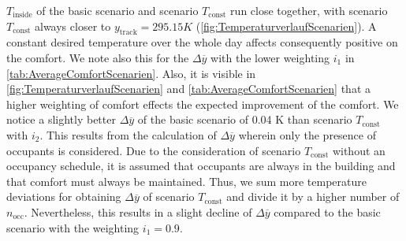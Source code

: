 $T_\text{inside}$ of the basic scenario and scenario $T_\text{const}$ run close together, with scenario $T_\text{const}$ always closer to $y_\text{track} = 295.15 K$ (\autoref{fig:TemperaturverlaufScenarien}). A constant desired temperature over the whole day affects consequently positive on the comfort. We note also this for the $\Delta \overline{y}$ with the lower weighting $i_\text{1}$ in \autoref{tab:AverageComfortScenarien}. Also, it is visible in \autoref{fig:TemperaturverlaufScenarien} and \autoref{tab:AverageComfortScenarien} that a higher weighting of comfort effects the expected improvement of the comfort. We notice a slightly better $\Delta \overline{y}$ of the basic scenario of 0.04 K than scenario $T_\text{const}$ with $i_\text{2}$. This results from the calculation of $\Delta \overline{y}$ wherein only the presence of occupants is considered. Due to the consideration of scenario $T_\text{const}$ without an occupancy schedule, it is assumed that occupants are always in the building and that comfort must always be maintained. Thus, we sum more temperature deviations for obtaining $\Delta \overline{y}$ of scenario $T_\text{const}$ and divide it by a higher number of $n_\text{occ}$. Nevertheless, this results in a slight decline of $\Delta \overline{y}$ compared to the basic scenario with the weighting $i_\text{1} = 0.9$. \newline

